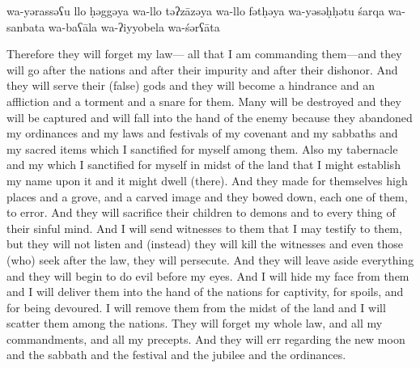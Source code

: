 \begin{transliteration}
    wa-yərassəʕu llo ḥəggəya
    wa-llo təʔzāzəya wa-llo fətḥəya wa-yəsəḥḥətu śarqa wa-sanbata
    wa-baʕāla wa-ʔiyyobela wa-śərʕāta
\end{transliteration}

\begin{translation}
    Therefore they will forget my law---%
    all that I am commanding them---and they will go after the nations and after
    their impurity and after their dishonor. And they will serve their (false) gods
    and they will become a hindrance and an affliction and a torment and a snare for them.
    Many will be destroyed and they will be captured and will fall into
    the hand of the enemy because they abandoned my ordinances and my laws and festivals of 
    my covenant and my sabbaths and my sacred items which I sanctified for myself among them.
    Also my tabernacle and my \temple which I sanctified for myself in midst of
    the land that I might establish my name upon it and it might dwell (there).
    And they made
    for themselves high places and a grove, and a carved image and they bowed down, each one of them,
    to error. And they will sacrifice their children to demons and to every thing
    of their sinful mind.
    And I will send witnesses to them that
    I may testify to them, but they will not listen and (instead) they will kill the witnesses and even
    those (who) seek after the law, they will persecute. And they will leave aside everything and they will begin to do
    evil before my eyes.
    And I will hide my face
    from them and I will deliver them into the hand of the nations for captivity,
    for spoils, and for being devoured. I will remove them from the midst of the land
    and I will scatter them among the nations.
    They will forget my whole law,
    and all my commandments, and all my precepts. And they will err regarding the new moon and the sabbath
    and the festival and the jubilee and the ordinances.
\end{translation}